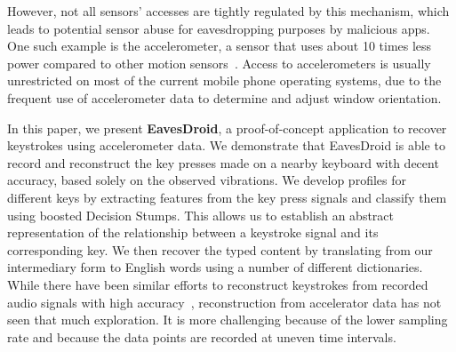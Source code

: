 \documentclass[11pt,conference]{IEEEtran}
\begin{document}
However, not all sensors' accesses are tightly regulated by this mechanism, which leads to potential sensor abuse for eavesdropping purposes by malicious apps.
One such example is the accelerometer, a sensor that uses about 10 times less power compared to other motion sensors~\cite{accelerometer-energy}.
Access to accelerometers is usually unrestricted on most of the current mobile phone operating systems, due to the frequent use of accelerometer data to determine and adjust window orientation.

In this paper, we present \textbf{EavesDroid}, a proof-of-concept application to recover keystrokes using 
accelerometer data. We demonstrate that EavesDroid is able to record and reconstruct the key presses made on a nearby keyboard with decent accuracy, based solely on the observed vibrations. We develop profiles for different keys by extracting features from the key press signals and classify them using boosted Decision Stumps. This allows us to establish an abstract representation of the relationship between a keystroke signal and its corresponding key. We then recover the typed content
by translating from our intermediary form to English words using a number
of different dictionaries.
While there have been similar efforts to reconstruct keystrokes from recorded audio signals with high accuracy~\cite{zhuang2005keyboard},
 reconstruction from accelerator data has not seen that much exploration. It is more challenging because of the lower sampling rate and because the data points are recorded at uneven time intervals.
\end{document}
